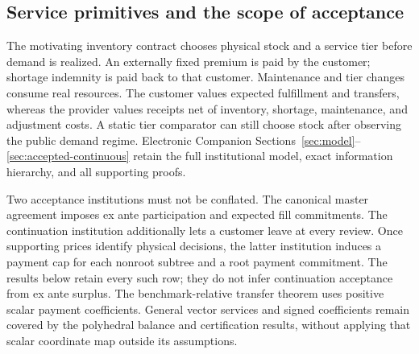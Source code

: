 \subsection{Service primitives and the scope of acceptance}
The motivating inventory contract chooses physical stock and a service tier
before demand is realized. An externally fixed premium is paid by the customer;
shortage indemnity is paid back to that customer. Maintenance and tier changes
consume real resources. The customer values expected fulfillment and transfers,
whereas the provider values receipts net of inventory, shortage, maintenance,
and adjustment costs. A static tier comparator can still choose stock after
observing the public demand regime. Electronic Companion
Sections~\ref{sec:model}--\ref{sec:accepted-continuous} retain the full institutional
model, exact information hierarchy, and all supporting proofs.

Two acceptance institutions must not be conflated. The canonical master
agreement imposes ex ante participation and expected fill commitments. The
continuation institution additionally lets a customer leave at every review.
Once supporting prices identify physical decisions, the latter institution
induces a payment cap for each nonroot subtree and a root payment commitment.
The results below retain every such row; they do not infer continuation
acceptance from ex ante surplus. The benchmark-relative transfer theorem uses
positive scalar payment coefficients. General vector services and signed
coefficients remain covered by the polyhedral balance and certification
results, without applying that scalar coordinate map outside its assumptions.

